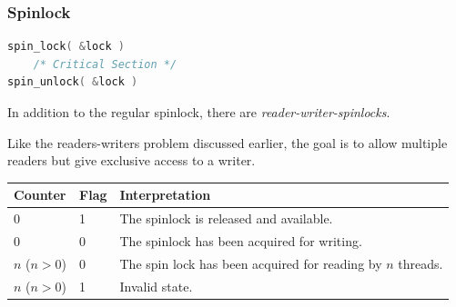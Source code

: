 \begin{frame}[fragile]
	\frametitle{Spinlock}

	\begin{lstlisting}[language=C]
spin_lock( &lock )
    /* Critical Section */
spin_unlock( &lock )
\end{lstlisting}


	In addition to the regular spinlock, there are \textit{reader-writer-spinlocks}.

	Like the readers-writers problem discussed earlier, the goal is to allow multiple readers but give exclusive access to a writer.

	\begin{center}
		\begin{tabular}{l|l|l}
			\textbf{Counter} & \textbf{Flag} & \textbf{Interpretation}                                     \\\hline
			0                & 1             & The spinlock is released and available.                     \\
			0                & 0             & The spinlock has been acquired for writing.                 \\
			$n$ ($n > 0$)    & 0             & The spin lock has been acquired for reading by $n$ threads. \\
			$n$ ($n > 0$)    & 1             & Invalid state.                                              \\
		\end{tabular}
	\end{center}


\end{frame}






